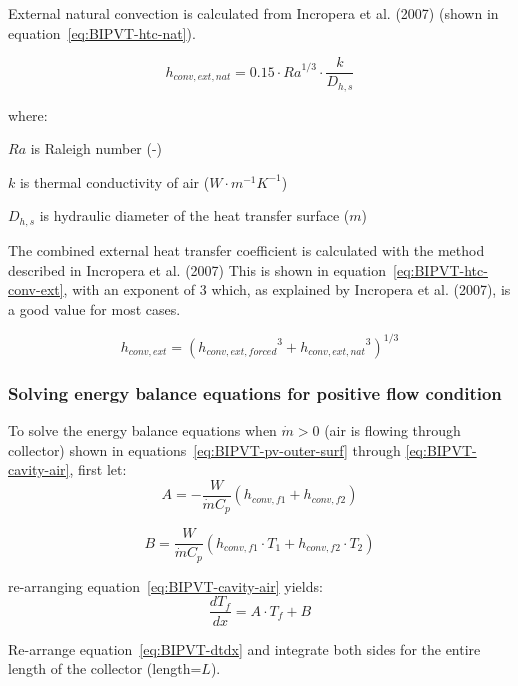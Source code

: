 External natural convection is calculated from Incropera et al. (2007) (shown in equation~\ref{eq:BIPVT-htc-nat}).

\begin{equation}
h_{conv,ext,nat}=0.15\cdot{Ra}^{1/3}\cdot\frac{k}{D_{h,s}}
\label{eq:BIPVT-htc-nat}
\end{equation}

where:

\(Ra\) is Raleigh number (-)

\(k\) is thermal conductivity of air (\(W\cdot m^{-1}K^{-1}\))

\(D_{h,s}\) is hydraulic diameter of the heat transfer surface (\(m\))

The combined external heat transfer coefficient is calculated with the method described in Incropera et al. (2007) This is shown in equation~\ref{eq:BIPVT-htc-conv-ext}, with an exponent of 3 which, as explained by Incropera et al. (2007), is a good value for most cases.

\begin{equation}
h_{conv,ext}=\left({h_{conv,ext,forced}}^3+{h_{conv,ext,nat}}^3\right)^{1/3}
\label{eq:BIPVT-htc-conv-ext}
\end{equation}

\subsubsection{Solving energy balance equations for positive flow condition}\label{BIPVT-solving}

To solve the energy balance equations when \(\dot{m}>0\) (air is flowing through collector) shown in equations~\ref{eq:BIPVT-pv-outer-surf} through \ref{eq:BIPVT-cavity-air}, first let:
\begin{equation}
A=-\frac{W}{\dot{m}C_p}\left(h_{conv,f1}+h_{conv,f2}\right)
\label{eq:BIPVT-A}
\end{equation}

\begin{equation}
B=\frac{W}{\dot{m}C_p}\left(h_{conv,f1}\cdot T_1+h_{conv,f2}\cdot T_2\right)
\label{eq:BIPVT-B}
\end{equation}

re-arranging equation~\ref{eq:BIPVT-cavity-air} yields:
\begin{equation}
\frac{dT_f}{dx}=A\cdot T_f+{B}
\label{eq:BIPVT-dtdx}
\end{equation}

Re-arrange equation~\ref{eq:BIPVT-dtdx} and integrate both sides for the entire length of the collector (length=\(L\)).

